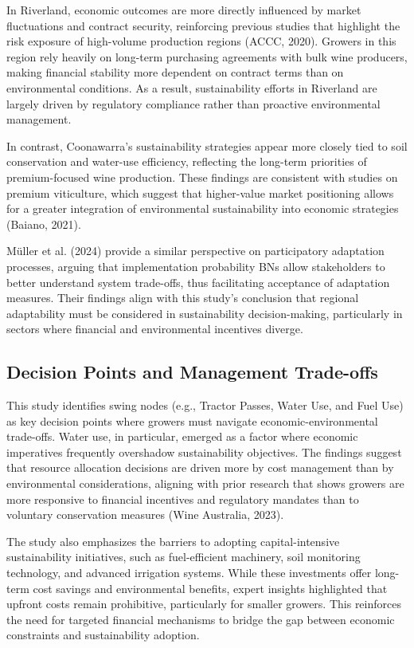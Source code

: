 \documentclass{article}
\begin{document}
In Riverland, economic outcomes are more directly influenced by market fluctuations and contract security, reinforcing previous studies that highlight the risk exposure of high-volume production regions (ACCC, 2020). Growers in this region rely heavily on long-term purchasing agreements with bulk wine producers, making financial stability more dependent on contract terms than on environmental conditions. As a result, sustainability efforts in Riverland are largely driven by regulatory compliance rather than proactive environmental management.

In contrast, Coonawarra’s sustainability strategies appear more closely tied to soil conservation and water-use efficiency, reflecting the long-term priorities of premium-focused wine production. These findings are consistent with studies on premium viticulture, which suggest that higher-value market positioning allows for a greater integration of environmental sustainability into economic strategies (Baiano, 2021).

Müller et al. (2024) provide a similar perspective on participatory adaptation processes, arguing that implementation probability BNs allow stakeholders to better understand system trade-offs, thus facilitating acceptance of adaptation measures. Their findings align with this study’s conclusion that regional adaptability must be considered in sustainability decision-making, particularly in sectors where financial and environmental incentives diverge.

\subsection{Decision Points and Management Trade-offs}
This study identifies swing nodes (e.g., Tractor Passes, Water Use, and Fuel Use) as key decision points where growers must navigate economic-environmental trade-offs. Water use, in particular, emerged as a factor where economic imperatives frequently overshadow sustainability objectives. The findings suggest that resource allocation decisions are driven more by cost management than by environmental considerations, aligning with prior research that shows growers are more responsive to financial incentives and regulatory mandates than to voluntary conservation measures (Wine Australia, 2023).

The study also emphasizes the barriers to adopting capital-intensive sustainability initiatives, such as fuel-efficient machinery, soil monitoring technology, and advanced irrigation systems. While these investments offer long-term cost savings and environmental benefits, expert insights highlighted that upfront costs remain prohibitive, particularly for smaller growers. This reinforces the need for targeted financial mechanisms to bridge the gap between economic constraints and sustainability adoption.
\end{document}
